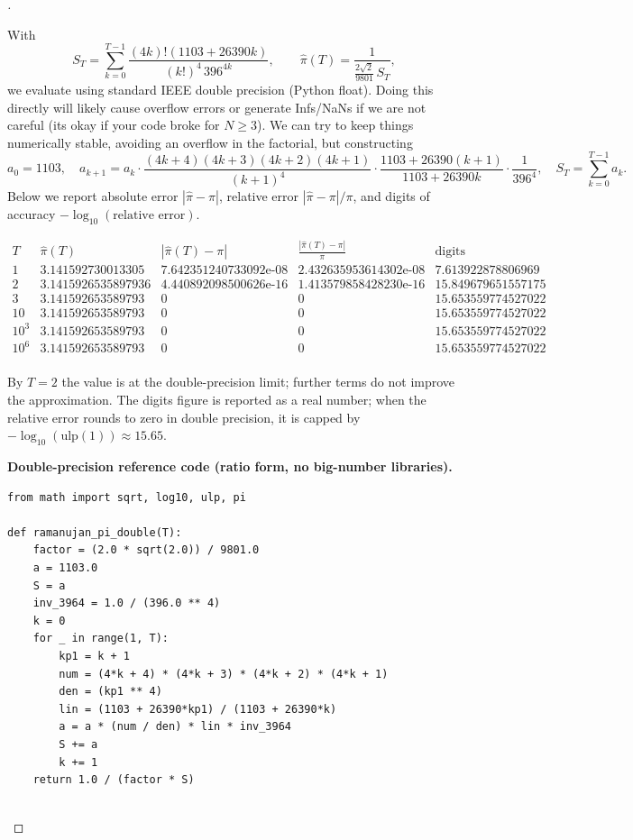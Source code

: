 \documentclass[11pt]{article}
\newenvironment{spacedproof}[1][\proofname]{%
  \begin{proof}[\textbf{#1}]$ $\par\nobreak\ignorespaces
}{%
  \end{proof}
}
\theoremstyle{definition}
\begin{document}
\begin{spacedproof}
With
\[
S_T=\sum_{k=0}^{T-1}\frac{(4k)!(1103+26390k)}{(k!)^4\,396^{4k}},\qquad
\widehat{\pi}(T)=\frac{1}{\frac{2\sqrt{2}}{9801}\,S_T},
\]
we evaluate using standard IEEE double precision (Python float). Doing this directly will likely cause overflow errors or generate Infs/NaNs if we are not careful (its okay if your code broke for $N\geq 3$). We can try to keep things numerically stable, avoiding an overflow in the factorial, but constructing
\[
a_{0}=1103,\quad
a_{k+1}=a_k\cdot\frac{(4k+4)(4k+3)(4k+2)(4k+1)}{(k+1)^4}\cdot\frac{1103+26390(k+1)}{1103+26390k}\cdot\frac{1}{396^4},\quad
S_T=\sum_{k=0}^{T-1} a_k.
\]
Below we report absolute error $|\widehat{\pi}-\pi|$, relative error $|\widehat{\pi}-\pi|/\pi$, and digits of accuracy $-\log_{10}(\text{relative error})$.

\[
\begin{array}{r|r|r|r|r}
T & \widehat{\pi}(T) & |\widehat{\pi}(T)-\pi| & \frac{|\widehat{\pi}(T)-\pi|}{\pi} & \text{digits} \\
\hline
1 & 3.141592730013305 & 7.642351240733092\text{e-}08 & 2.432635953614302\text{e-}08 & 7.613922878806969 \\
2 & 3.1415926535897936 & 4.440892098500626\text{e-}16 & 1.413579858428230\text{e-}16 & 15.849679651557175 \\
3 & 3.141592653589793 & 0 & 0 & 15.653559774527022 \\
10 & 3.141592653589793 & 0 & 0 & 15.653559774527022 \\
10^{3} & 3.141592653589793 & 0 & 0 & 15.653559774527022 \\
10^{6} & 3.141592653589793 & 0 & 0 & 15.653559774527022 \\
\end{array}
\]

By $T=2$ the value is at the double-precision limit; further terms do not improve the approximation. The digits figure is reported as a real number; when the relative error rounds to zero in double precision, it is capped by $-\log_{10}(\text{ulp}(1))\approx 15.65$.

\textbf{Double-precision reference code (ratio form, no big-number libraries).}
\begin{lstlisting}
from math import sqrt, log10, ulp, pi

def ramanujan_pi_double(T):
    factor = (2.0 * sqrt(2.0)) / 9801.0
    a = 1103.0
    S = a
    inv_3964 = 1.0 / (396.0 ** 4)
    k = 0
    for _ in range(1, T):
        kp1 = k + 1
        num = (4*k + 4) * (4*k + 3) * (4*k + 2) * (4*k + 1)
        den = (kp1 ** 4)
        lin = (1103 + 26390*kp1) / (1103 + 26390*k)
        a = a * (num / den) * lin * inv_3964
        S += a
        k += 1
    return 1.0 / (factor * S)


\end{lstlisting}
\end{spacedproof}
\end{document}
